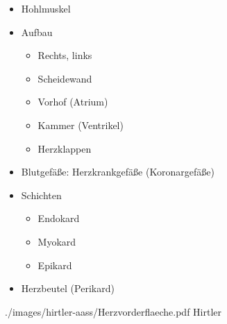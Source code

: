 {
\begin{itemize}
  \item Hohlmuskel
  \item Aufbau
  \begin{itemize}
    \item Rechts, links
    \item Scheidewand
    \item Vorhof (Atrium)
    \item Kammer (Ventrikel)
    \item Herzklappen
  \end{itemize}
  \item Blutgefäße: Herzkrankgefäße (Koronargefäße)
  \item Schichten
  \begin{itemize}
    \item Endokard
    \item Myokard
    \item Epikard
  \end{itemize}
  \item Herzbeutel (Perikard)
\end{itemize}}%
{./images/hirtler-aass/Herzvorderflaeche.pdf}%
{}%
{}%
{Hirtler}%
{}%



